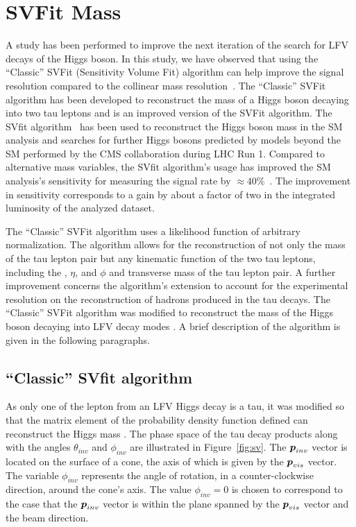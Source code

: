 %
%

\chapter{SVFit Mass}
\label{SVFit}

A study has been performed to improve the next iteration of the search for LFV decays of the Higgs boson. In this study, we have observed that using the ``Classic'' SVFit (Sensitivity Volume Fit) algorithm can help improve the signal resolution compared to the collinear mass resolution~\cite{Bianchini:2016yrt}. The ``Classic'' SVFit algorithm has been developed to reconstruct the mass of a Higgs boson decaying into two tau leptons \mtt and is an improved version of the SVFit algorithm. The SVfit algorithm~\cite{Bianchini:2014vza} has been used to reconstruct the Higgs boson mass in the SM \Htt analysis and searches for further Higgs bosons predicted by models beyond the SM performed by the CMS collaboration during LHC Run 1. Compared to alternative mass variables, the SVfit algorithm's usage has improved the SM \Htt analysis's sensitivity for measuring the signal rate by $\approx 40\%$~\cite{Chatrchyan:2014nva}. The improvement in sensitivity corresponds to a gain by about a factor of two in the integrated luminosity of the analyzed dataset.

The ``Classic'' SVFit algorithm uses a likelihood function of arbitrary normalization. The algorithm allows for the reconstruction of not only the mass \mtt of the tau lepton pair but any kinematic function of the two tau leptons, including the \pt, $\eta$, and $\phi$ and transverse mass of the tau lepton pair. A further improvement concerns the algorithm's extension to account for the experimental resolution on the reconstruction of hadrons produced in the tau decays. The ``Classic'' SVFit algorithm was modified to reconstruct the mass of the Higgs boson decaying into LFV decay modes \mlt. A brief description of the algorithm is given in the following paragraphs.

\section{``Classic'' SVfit algorithm}
As only one of the lepton from an LFV Higgs decay is a tau, it was modified so that the matrix element of the probability density function defined can reconstruct the Higgs mass \mlt. The phase space of the tau decay products along with the angles $\theta_{inv}$ and $\phi_{inv}$ are illustrated in Figure~\ref{fig:sv}. The $\boldsymbol{p}_{inv}$ vector is located on the surface of a cone, the axis of which is given by the $\boldsymbol{p}_{vis}$ vector. The variable $\phi_{inv}$ represents the angle of rotation, in a counter-clockwise direction, around the cone's axis. The value $\phi_{inv} = 0$ is chosen to correspond to the case that the $\boldsymbol{p}_{inv}$ vector is within the plane spanned by the $\boldsymbol{p}_{vis}$ vector and the beam direction.

